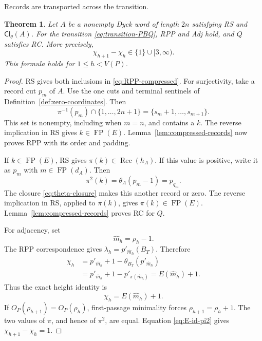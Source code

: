\documentclass[11pt]{article}
\newtheorem{theorem}{Theorem}[section]
\theoremstyle{definition}
\theoremstyle{remark}
\DeclareMathOperator{\Rec}{Rec}
\DeclareMathOperator{\FP}{FP}
\begin{document}
Records are transported across the transition.
\begin{theorem}
\label{thm:RPP-RC-Adj}
Let \(A\) be a nonempty Dyck word of length \(2n\) satisfying RS and
\(\mathsf{Cl}_\theta(A)\).  For the
transition \eqref{eq:transition-PBQ}, RPP and Adj hold, and \(Q\) satisfies
RC.  More precisely,
\begin{equation}
\label{eq:Adj-gap}
 \chi_{h+1}-\chi_h\in\{1\}\cup[3,\infty).
\end{equation}
This formula holds for \(1\leq h<V(P)\).
\end{theorem}

\begin{proof}
RS gives both inclusions in \eqref{eq:RPP-compressed}.  For surjectivity,
take a record cut \(p_m\) of \(A\).  Use the one cuts and terminal sentinels
of Definition~\ref{def:zero-coordinates}.  Then
\[
 \pi^{-1}(p_m)\cap\{1,\ldots,2n+1\}
 =\{s_m+1,\ldots,s_{m+1}\}.
\]
This set is nonempty, including when \(m=n\), and contains a \(k\).  The reverse implication in RS gives
\(k\in\FP(E)\).  Lemma~\ref{lem:compressed-records} now proves RPP with its
order and padding.

If \(k\in\FP(E)\), RS gives \(\pi(k)\in\Rec(h_A)\).  If this value is
positive, write it as \(p_m\) with \(m\in\FP(d_A)\).  Then
\[
 \pi^2(k)=\theta_A(p_m-1)=p_{q_m}.
\]
The closure \eqref{eq:theta-closure} makes this another record or zero.  The
reverse implication in RS, applied to \(\pi(k)\), gives
\(\pi(k)\in\FP(E)\).  Lemma~\ref{lem:compressed-records} proves RC for \(Q\).

For adjacency, set
\[
 \widehat m_h=\rho_h-1.
\]
The RPP correspondence gives
\(\lambda_h=p'_{\widehat m_h}(B_T)\).  Therefore
\[
\begin{aligned}
 \chi_h
 &=p'_{\widehat m_h}+1-
   \theta_{B_T}(p'_{\widehat m_h})\\
 &=p'_{\widehat m_h}+1-p'_{\pi(\widehat m_h)}
  =E(\widehat m_h)+1.
\end{aligned}
\]
Thus the exact height identity is
\begin{equation*}
 \chi_h=E(\widehat m_h)+1.
\end{equation*}
If \(O_P(\rho_{h+1})=O_P(\rho_h)\), first-passage minimality forces
\(\rho_{h+1}=\rho_h+1\).  The two values of \(\pi\), and hence of
\(\pi^2\), are equal.  Equation \eqref{eq:E-id-pi2} gives
\(\chi_{h+1}-\chi_h=1\).


\end{proof}
\end{document}
